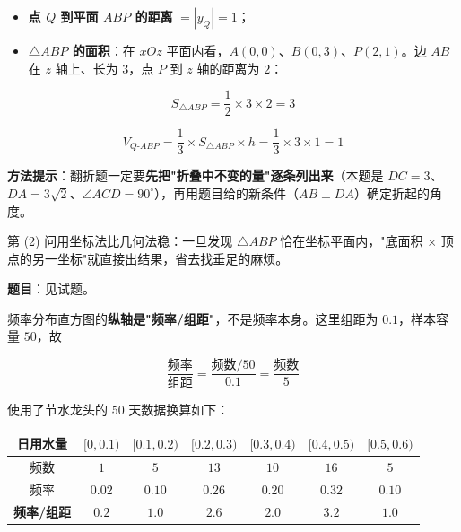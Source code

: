 \begin{itemize}
\item \textbf{点 $Q$ 到平面 $ABP$ 的距离} $=|y_Q|=1$；
\item \textbf{$\triangle ABP$ 的面积}：在 $xOz$ 平面内看，$A(0,0)$、$B(0,3)$、$P(2,1)$。边 $AB$ 在 $z$ 轴上、长为 $3$，点 $P$ 到 $z$ 轴的距离为 $2$：
\end{itemize}
\[S_{\triangle ABP}=\frac12\times3\times2=3\]

\[V_{Q\text{-}ABP}=\frac13\times S_{\triangle ABP}\times h=\frac13\times3\times1=1\]


\begin{gktip}
\textbf{方法提示}：翻折题一定要\textbf{先把"折叠中不变的量"逐条列出来}（本题是 $DC=3$、$DA=3\sqrt2$、$\angle ACD=90^\circ$），再用题目给的新条件（$AB\perp DA$）确定折起的角度。

第 (2) 问用坐标法比几何法稳：一旦发现 $\triangle ABP$ 恰在坐标平面内，"底面积 $\times$ 顶点的另一坐标"就直接出结果，省去找垂足的麻烦。
\end{gktip}

\par\medskip


\textbf{题目}：见试题。


频率分布直方图的\textbf{纵轴是"频率/组距"}，不是频率本身。这里组距为 $0.1$，样本容量 $50$，故

\[\frac{\text{频率}}{\text{组距}}=\frac{\text{频数}/50}{0.1}=\frac{\text{频数}}5\]

使用了节水龙头的 $50$ 天数据换算如下：

\begin{center}
\begin{tabular}{ccccccc}
\toprule
日用水量 & $[0,0.1)$ & $[0.1,0.2)$ & $[0.2,0.3)$ & $[0.3,0.4)$ & $[0.4,0.5)$ & $[0.5,0.6)$ \\
\midrule
频数 & $1$ & $5$ & $13$ & $10$ & $16$ & $5$ \\
频率 & $0.02$ & $0.10$ & $0.26$ & $0.20$ & $0.32$ & $0.10$ \\
\textbf{频率/组距} & $\mathbf{0.2}$ & $\mathbf{1.0}$ & $\mathbf{2.6}$ & $\mathbf{2.0}$ & $\mathbf{3.2}$ & $\mathbf{1.0}$ \\
\bottomrule
\end{tabular}
\end{center}

